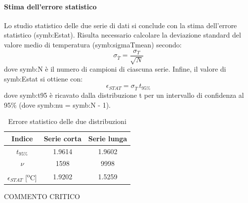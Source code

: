 \paragraph{Stima dell'errore statistico}
Lo studio statistico delle due serie di dati si conclude con la stima dell'errore statistico (\gls{symb:Estat}).  Risulta necessario calcolare la deviazione standard del valore medio di temperatura (\gls{symb:sigmaTmean}) secondo:
\begin{equation}
	\sigma_{\overline{T}} = \frac{\sigma_{T}}{\sqrt{N}} 
\end{equation}
dove \gls{symb:N} è il numero di campioni di ciascuna serie.
Infine, il valore di \gls{symb:Estat} si ottiene con:
\begin{equation}
	\epsilon_{\textit{STAT}}=\sigma_{\overline{T}}\,t_{\textit{95\%}}
\end{equation}
dove \gls{symb:t95} è ricavato dalla distribuzione t per un intervallo di confidenza al 95\% (dove \gls{symb:nu} = \gls{symb:N} - 1).
\begin{table} [H]
	\centering
	\begin{tabular}{c|c|c}
		\toprule
		\toprule
		\textbf{Indice} & \textbf{Serie corta}&\textbf{Serie lunga}\\
		\midrule
		\midrule
		$t_{\textit{95\%}}$ &1.9614&1.9602\\
		\midrule
		$\nu$ & 1598 & 9998\\
		\midrule
		$\epsilon_{\textit{STAT}}$ [\textsuperscript{o}C]& 1.9202 & 1.5259\\
		\bottomrule
		\bottomrule
	\end{tabular}
	\caption{Errore statistico delle due distribuzioni}
	\label{tab:errorestat}
\end{table}

COMMENTO CRITICO
